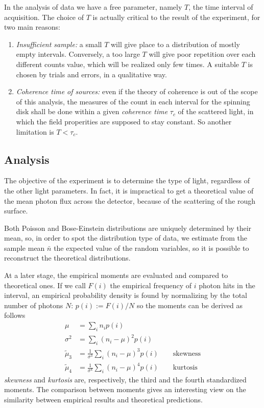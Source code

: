 \documentclass[10pt, a4paper, final]{article}
\begin{document}
\begin{multicols}{2}
In the analysis of data we have a free parameter, namely $T$, the time interval of acquisition. The choice of $T$ is actually critical to the result of the experiment, for two main reasons:
\begin{enumerate}
    \item \emph{Insufficient sample:}
     a small $T$ will give place to a distribution of mostly empty intervals. Conversely, a too large $T$ will give poor repetition over each different counts value, which will be realized only few times. A suitable $T$ is chosen by trials and errors, in a qualitative way.
    \item \emph{Coherence time of sources:}
     even if the theory of coherence is out of the scope of this analysis, the measures of the count in each interval for the spinning disk shall be done within a given \emph{coherence time} $\tau_c$ of the scattered light, in which the field properities are supposed to stay constant. So another limitation is $T<\tau_c$.
\end{enumerate}


\subsection*{Analysis}
The objective of the experiment is to determine the type of light, regardless of the other light parameters. In fact, it is impractical to get a theoretical value of the mean photon flux across the detector, because of the scattering of the rough surface. 

Both Poisson and Bose-Einstein distributions are uniquely determined by their mean, so, in order to spot the distribution type of data, we estimate from the sample mean $\bar{n}$ the expected value of the random variables, so it is possible to reconstruct the theoretical distributions. 

At a later stage, the empirical moments are evaluated and compared to theoretical ones.
If we call $F(i)$ the empirical frequency of $i$ photon hits in the interval, an empirical probability density is found by normalizing by the total number of photons $N$: $p(i) := F(i) / N$ so the moments can be derived as follows
\begin{align*}
    \mu &= \sum_i n_i p(i) \\
    \sigma^2 &= \sum_i (n_i - \mu)^2 p(i) \\
    \tilde{\mu}_3 &= \frac{1}{\sigma^3}\sum_i (n_i - \mu)^3 p(i) \qquad \text{skewness}\\
    \tilde{\mu}_4 &= \frac{1}{\sigma^4}\sum_i (n_i - \mu)^4 p(i) \qquad \text{kurtosis}
\end{align*}
\emph{skewness} and \emph{kurtosis} are, respectively, the third and the fourth standardized moments.
The comparison between moments gives an interesting view on the similarity between empirical results and theoretical predictions.


\end{multicols}
\end{document}
